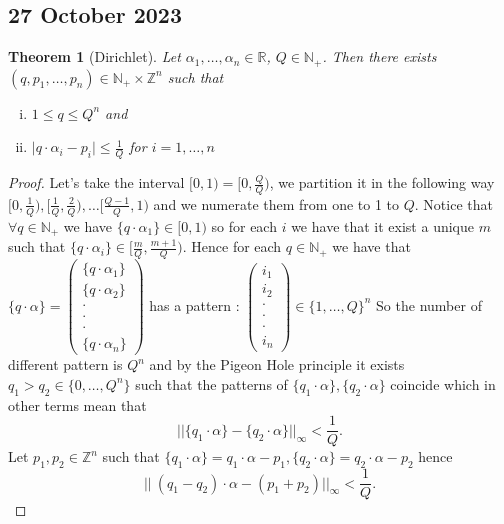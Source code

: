 \documentclass[a4paper,11pt,american]{article}
\newcommand{\N}{\mathbb{N}}
\newcommand{\R}{\mathbb{R}}
\newcommand{\Z}{\mathbb{Z}}
\theoremstyle{plain}
\newtheorem{theorem}{Theorem}
\theoremstyle{definition}
\begin{document}
\subsection*{27 October 2023}
\begin{theorem}[Dirichlet]
    Let $\alpha_1,\dots,\alpha_n\in\R$, $Q\in\N_+$. Then there exists $(q,p_1,\dots,p_n)\in\N_+\times\Z^n$ such that
    \begin{enumerate}[i)]
        \item $1\leq q\leq Q^n$ and
        \item $\vert q\cdot\alpha_i-p_i\vert\leq \frac{1}{Q}$ for $i=1,\dots,n$
    \end{enumerate}
\end{theorem}
\begin{proof}
    Let's take the interval $[0,1)=[0,\frac{Q}{Q})$, we partition it in the following way $[0,\frac{1}{Q}),[\frac{1}{Q},\frac{2}{Q}),\dots [\frac{Q-1}{Q},1)$ and we numerate them from one to 1 to $Q$. Notice that $\forall q\in \N_+$ we have $\{q\cdot\alpha_1\}\in [0,1)$ so for each $i$ we have that it exist a unique $m$ such that  $\{q\cdot\alpha_i\}\in [\frac{m}{Q},\frac{m+1}{Q})$. Hence for each $q\in\N_+$ we have that $\{q\cdot\alpha\}=\begin{pmatrix}
        \{q\cdot\alpha_1\}\\
        \{q\cdot\alpha_2\}\\
        \cdot\\
        \cdot\\
        \cdot\\
        \{q\cdot\alpha_n\}
    \end{pmatrix}$ has a pattern : $\begin{pmatrix}
        i_1\\
        i_2\\
        \cdot\\
        \cdot\\
        \cdot\\
        i_n
    \end{pmatrix}\in\{1,\dots,Q\}^n$
    So the number of different pattern is $Q^n$ and by the Pigeon Hole principle it exists $q_1>q_2\in\{0,\dots, Q^n\}$ such that the patterns of $\{q_1\cdot\alpha\},\{q_2\cdot\alpha\}$ coincide which in other terms mean that $$\vert\vert\{q_1\cdot\alpha\}-\{q_2\cdot\alpha\}\vert\vert_{\infty}<\frac{1}{Q} .$$
    Let $p_1,p_2\in\Z^n$ such that $\{q_1\cdot\alpha\}=q_1\cdot\alpha-p_1,\{q_2\cdot\alpha\}=q_2\cdot\alpha-p_2$ hence $$\vert\vert\ (q_1-q_2)\cdot\alpha-(p_1+p_2)\vert\vert_{\infty}<\frac{1}{Q}.$$
\end{proof}
\end{document}
